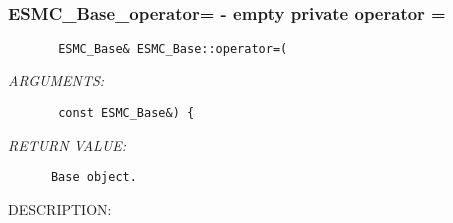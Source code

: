  
\setlength{\oldparskip}{\parskip}
\setlength{\parskip}{1.5ex}
\setlength{\oldparindent}{\parindent}
\setlength{\parindent}{0pt}
\setlength{\oldbaselineskip}{\baselineskip}
\setlength{\baselineskip}{11pt}
 
\def\bv{\begin{verbatim}}
\def\ev{\end{verbatim}}
\def\be{\begin{equation}}
\def\ee{\end{equation}}
\def\bea{\begin{eqnarray}}
\def\eea{\end{eqnarray}}
\def\bi{\begin{itemize}}
\def\ei{\end{itemize}}
\def\bn{\begin{enumerate}}
\def\en{\end{enumerate}}
\def\bd{\begin{description}}
\def\ed{\end{description}}
\def\({\left (}
\def\){\right )}
\def\[{\left [}
\def\]{\right ]}
\def\<{\left  \langle}
\def\>{\right \rangle}
\def\cI{{\cal I}}
\def\diag{\mathop{\rm diag}}
\def\tr{\mathop{\rm tr}}


 

  
 
\mbox{}\hrulefill\
 
\subsubsection [ESMC\_Base\_operator=] {ESMC\_Base\_operator= - empty private operator =}


  
\begin{verbatim}       ESMC_Base& ESMC_Base::operator=(\end{verbatim}{\em ARGUMENTS:}
\begin{verbatim}       const ESMC_Base&) {\end{verbatim}{\em RETURN VALUE:}
\begin{verbatim}      Base object.\end{verbatim}
{\sf DESCRIPTION:\\ }


